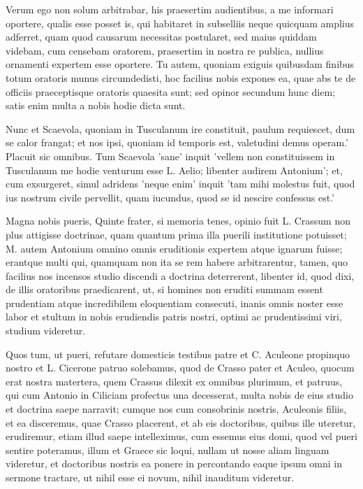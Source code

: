  Verum ego non solum arbitrabar, his praesertim audientibus, a me informari oportere, qualis esse posset is, qui habitaret in subselliis neque quicquam amplius adferret, quam quod causarum necessitas postularet, sed maius quiddam videbam, cum censebam oratorem, praesertim in nostra re publica, nullius ornamenti expertem esse oportere. Tu autem, quoniam exiguis quibusdam finibus totum oratoris munus circumdedisti, hoc facilius nobis expones ea, quae abs te de officiis praeceptisque oratoris quaesita sunt; sed opinor secundum hunc diem; satis enim multa a nobis hodie dicta sunt.

 Nunc et Scaevola, quoniam in Tusculanum ire constituit, paulum requiescet, dum se calor frangat; et nos ipsi, quoniam id temporis est, valetudini demus operam.' Placuit sic omnibus. Tum Scaevola 'sane' inquit 'vellem non constituissem in Tusculanum me hodie venturum esse L. Aelio; libenter audirem Antonium'; et, cum exsurgeret, simul adridens 'neque enim' inquit 'tam mihi molestus fuit, quod ius nostrum civile pervellit, quam iucundus, quod se id nescire confessus est.'

 Magna nobis pueris, Quinte frater, si memoria tenes, opinio fuit L. Crassum non plus attigisse doctrinae, quam quantum prima illa puerili institutione potuisset; M. autem Antonium omnino omnis eruditionis expertem atque ignarum fuisse; erantque multi qui, quamquam non ita se rem habere arbitrarentur, tamen, quo facilius nos incensos studio discendi a doctrina deterrerent, libenter id, quod dixi, de illis oratoribus praedicarent, ut, si homines non eruditi summam essent prudentiam atque incredibilem eloquentiam consecuti, inanis omnis noster esse labor et stultum in nobis erudiendis patris nostri, optimi ac prudentissimi viri, studium videretur.

 Quos tum, ut pueri, refutare domesticis testibus patre et C. Aculeone propinquo nostro et L. Cicerone patruo solebamus, quod de Crasso pater et Aculeo, quocum erat nostra matertera, quem Crassus dilexit ex omnibus plurimum, et patruus, qui cum Antonio in Ciliciam profectus una decesserat, multa nobis de eius studio et doctrina saepe narravit; cumque nos cum consobrinis nostris, Aculeonis filiis, et ea disceremus, quae Crasso placerent, et ab eis doctoribus, quibus ille uteretur, erudiremur, etiam illud saepe intelleximus, cum essemus eius domi, quod vel pueri sentire poteramus, illum et Graece sic loqui, nullam ut nosse aliam linguam videretur, et doctoribus nostris ea ponere in percontando eaque ipsum omni in sermone tractare, ut nihil esse ei novum, nihil inauditum videretur.


